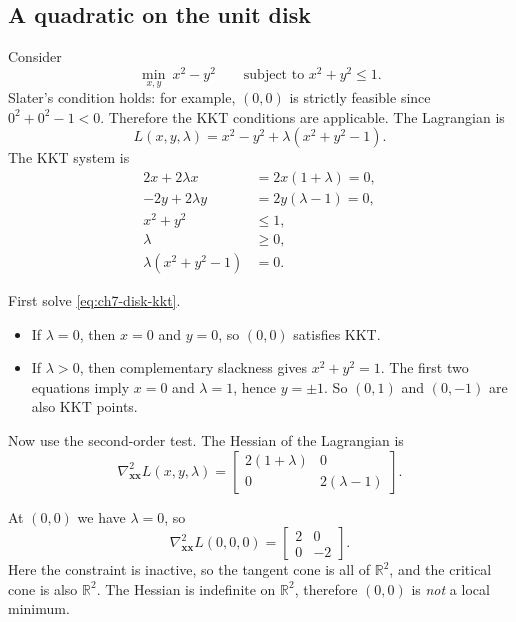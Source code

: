 \subsection{A quadratic on the unit disk}
\begin{example}
\label{ex:ch7-disk}
Consider
\[
  \min_{x,y} \ x^2-y^2
  \qquad \text{subject to } x^2+y^2\le 1.
\]
Slater's condition holds: for example, $(0,0)$ is strictly feasible since
$0^2+0^2-1<0$. Therefore the KKT conditions are applicable.
The Lagrangian is
\[
  L(x,y,\lambda)=x^2-y^2+\lambda(x^2+y^2-1).
\]
The KKT system is
\begin{equation}
  \label{eq:ch7-disk-kkt}
  \begin{aligned}
    2x+2\lambda x &= 2x(1+\lambda)=0, \\
    -2y+2\lambda y &= 2y(\lambda-1)=0, \\
    x^2+y^2 &\le 1, \\
    \lambda &\ge 0, \\
    \lambda(x^2+y^2-1)&=0.
  \end{aligned}
\end{equation}

First solve \eqref{eq:ch7-disk-kkt}.
\begin{itemize}
  \item If $\lambda=0$, then $x=0$ and $y=0$, so $(0,0)$ satisfies KKT.
  \item If $\lambda>0$, then complementary slackness gives $x^2+y^2=1$. The
  first two equations imply $x=0$ and $\lambda=1$, hence $y=\pm 1$. So
  $(0,1)$ and $(0,-1)$ are also KKT points.
\end{itemize}

Now use the second-order test. The Hessian of the Lagrangian is
\[
  \nabla_{\mathbf{x}\mathbf{x}}^2 L(x,y,\lambda)
  =
  \begin{bmatrix}
    2(1+\lambda) & 0 \\
    0 & 2(\lambda-1)
  \end{bmatrix}.
\]

At $(0,0)$ we have $\lambda=0$, so
\[
  \nabla_{\mathbf{x}\mathbf{x}}^2 L(0,0,0)
  =
  \begin{bmatrix}
    2 & 0 \\
    0 & -2
  \end{bmatrix}.
\]
Here the constraint is inactive, so the tangent cone is all of $\mathbb{R}^2$,
and the critical cone is also $\mathbb{R}^2$. The Hessian is indefinite on
$\mathbb{R}^2$, therefore $(0,0)$ is \emph{not} a local minimum.


\end{example}
